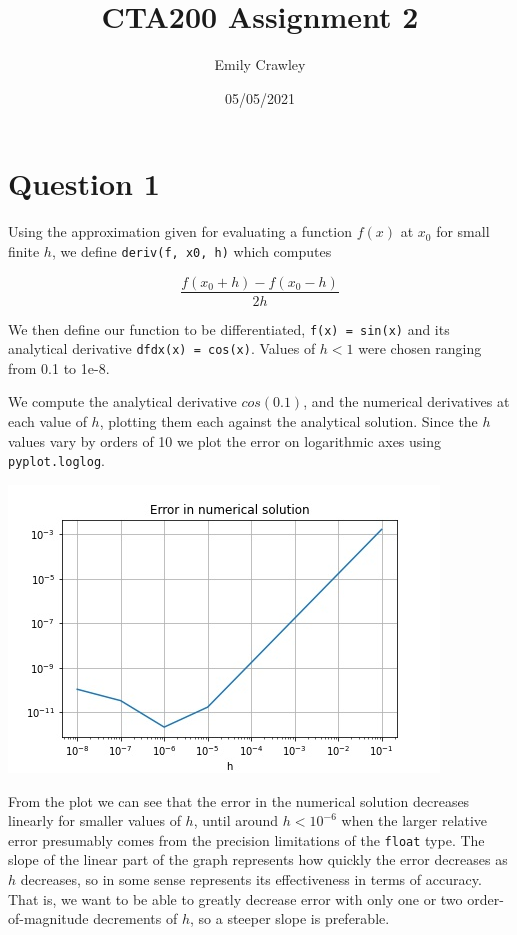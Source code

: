 \documentclass{article}
\title{CTA200 Assignment 2}
\author{Emily Crawley}
\date{05/05/2021}
\begin{document}
\maketitle

\section*{Question 1}

Using the approximation given for evaluating a function $f(x)$ at $x_0$ for small finite $h$, we define \texttt{deriv(f, x0, h)} which computes

$$ \frac{f(x_0 + h) - f(x_0 - h)}{2h} $$

We then define our function to be differentiated, \texttt{f(x) = sin(x)} and its analytical derivative \texttt{dfdx(x) = cos(x)}. Values of $h < 1$ were chosen ranging from 0.1 to 1e-8.

We compute the analytical derivative $cos(0.1)$, and the numerical derivatives at each value of $h$, plotting them each against the analytical solution. Since the $h$ values vary by orders of 10 we plot the error on logarithmic axes using \texttt{pyplot.loglog}.

\includegraphics[scale=0.7]{plot1}

From the plot we can see that the error in the numerical solution decreases linearly for smaller values of $h$, until around $h < 10^{-6}$ when the larger relative error presumably comes from the precision limitations of the \texttt{float} type. The slope of the linear part of the graph represents how quickly the error decreases as $h$ decreases, so in some sense represents its effectiveness in terms of accuracy. That is, we want to be able to greatly decrease error with only one or two order-of-magnitude decrements of $h$, so a steeper slope is preferable.
\end{document}
